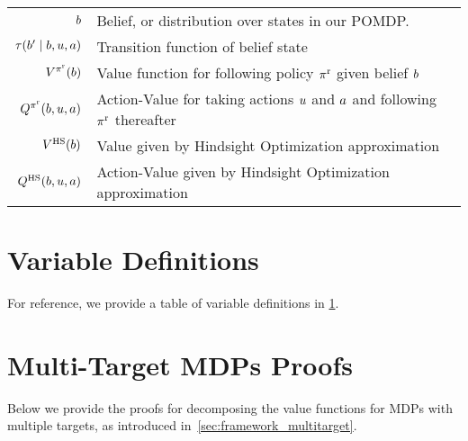\begin{appendices}
\begin{table*}[!t]
\begin{tabular}{rl}
$b$ & Belief, or distribution over states in our POMDP.\\
$\tau(b' \mid b, u, a)$ & Transition function of belief state\\
$V^{\pi^{\text{r}}}(b)$ & Value function for following policy $\pi^{\text{r}}$ given belief $b$\\
$Q^{\pi^{\text{r}}}(b, u, a)$ & Action-Value for taking actions $u$ and $a$ and following $\pi^{\text{r}}$ thereafter\\
$V^{\text{HS}}(b)$ & Value given by Hindsight Optimization approximation\\
$Q^{\text{HS}}(b, u, a)$ & Action-Value given by Hindsight Optimization approximation\\
\bottomrule
\end{tabular}
\label{table:variable_definitions}
\end{table*}


\section{Variable Definitions} 
\label{sec:variable_definitions}

For reference, we provide a table of variable definitions in \cref{table:variable_definitions}.

\section{Multi-Target MDPs Proofs}
\label{sec:mingoal_thms}

Below we provide the proofs for decomposing the value functions for MDPs with multiple targets, as introduced in~\cref{sec:framework_multitarget}.



\end{appendices}
